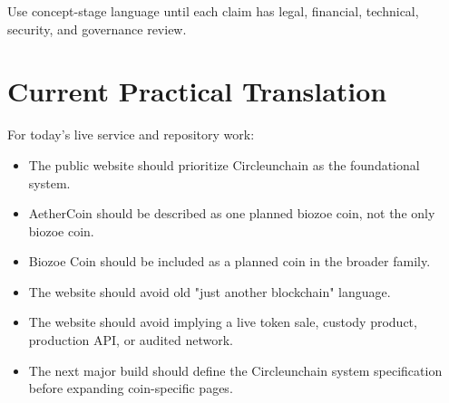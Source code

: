 ﻿\documentclass[12pt]{article}
\begin{document}
Use concept-stage language until each claim has legal, financial, technical, security, and governance review.

\section{Current Practical Translation}


For today's live service and repository work:

\begin{itemize}
  \item The public website should prioritize Circleunchain as the foundational system.
\end{itemize}
\begin{itemize}
  \item AetherCoin should be described as one planned biozoe coin, not the only biozoe coin.
\end{itemize}
\begin{itemize}
  \item Biozoe Coin should be included as a planned coin in the broader family.
\end{itemize}
\begin{itemize}
  \item The website should avoid old "just another blockchain" language.
\end{itemize}
\begin{itemize}
  \item The website should avoid implying a live token sale, custody product, production API, or audited network.
\end{itemize}
\begin{itemize}
  \item The next major build should define the Circleunchain system specification before expanding coin-specific pages.
\end{itemize}

\aftClosingPage
\end{document}
